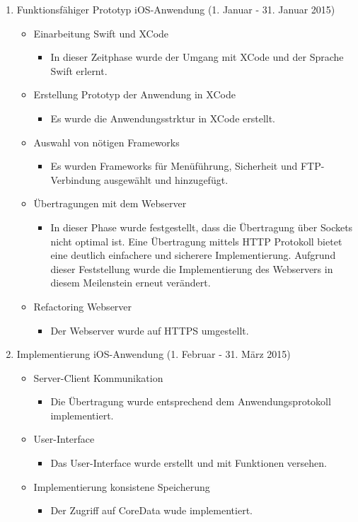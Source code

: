 \begin{enumerate}
\item Funktionsfähiger Prototyp iOS-Anwendung (1. Januar - 31. Januar 2015)
\begin{itemize}
\item Einarbeitung Swift und XCode
\begin{itemize}
\item In dieser Zeitphase wurde der Umgang mit XCode und der Sprache Swift erlernt. 
\end{itemize}
\item Erstellung Prototyp der Anwendung in XCode
\begin{itemize}
\item Es wurde die Anwendungsstrktur in XCode erstellt. 
\end{itemize}
\item Auswahl von nötigen Frameworks
\begin{itemize}
\item Es wurden Frameworks für Menüführung, Sicherheit und FTP-Verbindung ausgewählt und hinzugefügt. 
\end{itemize}
\item Übertragungen mit dem Webserver
\begin{itemize}
\item In dieser Phase wurde festgestellt, dass die Übertragung über Sockets nicht optimal ist. Eine Übertragung mittels HTTP Protokoll bietet eine deutlich einfachere und sicherere Implementierung. Aufgrund dieser Feststellung wurde die Implementierung des Webservers in diesem Meilenstein erneut verändert. 
\end{itemize}
\item Refactoring Webserver
\begin{itemize}
\item Der Webserver wurde auf HTTPS umgestellt. 
\end{itemize}
\end{itemize}

\item Implementierung iOS-Anwendung (1. Februar - 31. März 2015)
\begin{itemize}
\item Server-Client Kommunikation
\begin{itemize}
\item Die Übertragung wurde entsprechend dem Anwendungsprotokoll implementiert. 
\end{itemize}
\item User-Interface
\begin{itemize}
\item Das User-Interface wurde erstellt und mit Funktionen versehen. 
\end{itemize}
\item Implementierung konsistene Speicherung
\begin{itemize}
\item Der Zugriff auf CoreData wude implementiert.
\end{itemize}
\end{itemize}


\end{enumerate}
